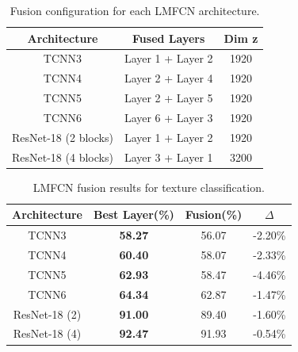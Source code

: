 \documentclass[conference]{IEEEtran}
\begin{document}
\begin{table}[htbp]
\caption{Fusion configuration for each LMFCN architecture.}
\begin{center}
\begin{tabular}{c|c|c}
\hline
\textbf{Architecture} & \textbf{Fused Layers} & \textbf{Dim z}\\
\hline
TCNN3 & Layer 1 + Layer 2 & 1920 \\

TCNN4 & Layer 2 + Layer 4 & 1920 \\

TCNN5 & Layer 2 + Layer 5 & 1920 \\

TCNN6 & Layer 6 + Layer 3 & 1920 \\

ResNet-18 (2 blocks) & Layer 1 + Layer 2 & 1920 \\

ResNet-18 (4 blocks) & Layer 3 + Layer 1 & 3200 \\
\hline
\end{tabular}
\label{tab8}
\end{center}
\end{table}

\begin{table}[htbp]
\caption{LMFCN fusion results for texture classification.}
\begin{center}
\begin{tabular}{c|c|c|c}
\hline
\textbf{Architecture} & \textbf{Best Layer(\%)} & \textbf{Fusion(\%)} & \textbf{$\Delta$}\\
\hline
TCNN3 & \textbf{58.27} & 56.07 & -2.20\% \\
TCNN4 & \textbf{60.40} & 58.07 & -2.33\% \\
TCNN5 & \textbf{62.93} & 58.47 & -4.46\% \\
TCNN6 & \textbf{64.34} & 62.87 & -1.47\% \\
ResNet-18 (2) & \textbf{91.00} & 89.40 & -1.60\% \\
ResNet-18 (4) & \textbf{92.47} & 91.93 & -0.54\% \\
\hline
\end{tabular}
\label{tab9}
\end{center}
\end{table}
\end{document}
